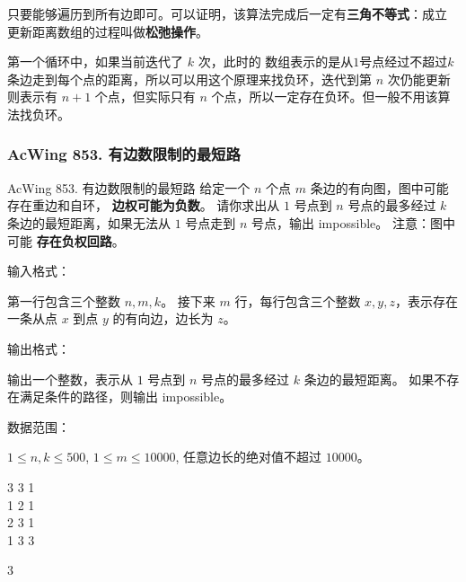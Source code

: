 只要能够遍历到所有边即可。可以证明，该算法完成后一定有\textbf{三角不等式}：成立
更新距离数组的过程叫做\textbf{松弛操作}。

第一个循环中，如果当前迭代了 $k$ 次，此时的  数组表示的是从$1$号点经过不超过$k$条边走到每个点的距离，所以可以用这个原理来找负环，迭代到第 $n$ 次仍能更新则表示有 $n+1$ 个点，但实际只有 $n$ 个点，所以一定存在负环。但一般不用该算法找负环。

\subsubsection{AcWing 853. 有边数限制的最短路}
\begin{titledbox}{AcWing 853. 有边数限制的最短路}
    给定一个 $n$ 个点 $m$ 条边的有向图，图中可能存在重边和自环， \textbf{边权可能为负数}。 请你求出从 $1$ 号点到 $n$ 号点的最多经过 $k$ 条边的最短距离，如果无法从 $1$ 号点走到 $n$ 号点，输出 impossible。 注意：图中可能 \textbf{存在负权回路}。

    输入格式：

    第一行包含三个整数 $n,m,k$。 接下来 $m$ 行，每行包含三个整数 $x,y,z$，表示存在一条从点 $x$ 到点 $y$ 的有向边，边长为 $z$。

    输出格式：

    输出一个整数，表示从 $1$ 号点到 $n$ 号点的最多经过 $k$ 条边的最短距离。 如果不存在满足条件的路径，则输出 impossible。

    数据范围：

    $1 \le n,k \le 500$, $1 \le m \le 10000$, 任意边长的绝对值不超过 $10000$。

    \begin{inputblock}
        3 3 1 \\
        1 2 1 \\
        2 3 1 \\
        1 3 3
    \end{inputblock}
    \begin{outputblock}
        3
    \end{outputblock}
\end{titledbox}

